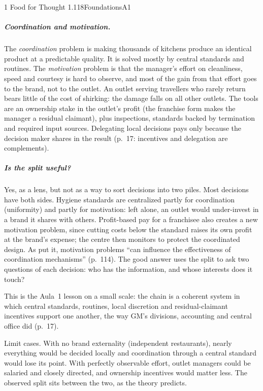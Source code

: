 \begin{exsol}{1}{\MR{} Food for Thought 1.1}{18}{Foundations}{A1}
\subparagraph{Coordination and motivation.} The \emph{coordination} problem is making thousands of
kitchens produce an identical product at a predictable quality. It is solved mostly by central
standards and routines. The \emph{motivation} problem is that the manager's effort on cleanliness,
speed and courtesy is hard to observe, and most of the gain from that effort goes to the brand, not
to the outlet. An outlet serving travellers who rarely return bears little of the cost of shirking:
the damage falls on all other outlets. The tools are an ownership stake in the outlet's profit
(the franchise form makes the manager a residual claimant), plus inspections, standards backed by
termination and required input sources. Delegating local decisions pays only because the decision
maker shares in the result (p.~17: incentives and delegation are complements).

\subparagraph{Is the split useful?} Yes, as a lens, but not as a way to sort decisions into two
piles. Most decisions have both sides. Hygiene standards are centralized partly for coordination
(uniformity) and partly for motivation: left alone, an outlet would under-invest in a brand it
shares with others. Profit-based pay for a franchisee also creates a new motivation problem, since
cutting costs below the standard raises its own profit at the brand's expense; the centre then
monitors to protect the coordinated design. As \MR{} put it, motivation problems ``can influence
the effectiveness of coordination mechanisms'' (p.~114). The good answer uses the split to ask two
questions of each decision: who has the information, and whose interests does it touch?

\interp This is the Aula~1 lesson on a small scale: the chain is a coherent system in which central
standards, routines, local discretion and residual-claimant incentives support one another, the
way GM's divisions, accounting and central office did (p.~17).

\verify Limit cases. With no brand externality (independent restaurants), nearly everything would
be decided locally and coordination through a central standard would lose its point. With
perfectly observable effort, outlet managers could be salaried and closely directed, and ownership
incentives would matter less. The observed split sits between the two, as the theory predicts.

\end{exsol}
